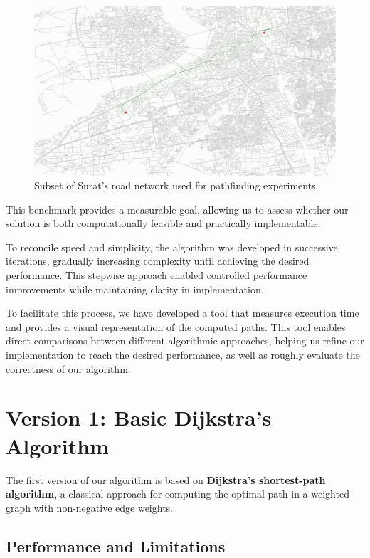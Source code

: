 	\begin{figure}[h]
		\centering
		\includegraphics[width=1.0\textwidth]{surat_graph.png}
		\caption{Subset of Surat's road network used for pathfinding experiments.}
		\label{fig:surat_graph}
	\end{figure}

	This benchmark provides a measurable goal, allowing us to assess whether our solution is both computationally feasible and practically implementable. \newline
	
	To reconcile speed and simplicity, the algorithm was developed in successive iterations, gradually increasing complexity until achieving the desired performance. This stepwise approach enabled controlled performance improvements while maintaining clarity in implementation.\newline
	
	To facilitate this process, we have developed a tool that measures execution time and provides a visual representation of the computed paths. This tool enables direct comparisons between different algorithmic approaches, helping us refine our implementation to reach the desired performance, as well as roughly evaluate the correctness of our algorithm.
	
	\section{Version 1: Basic Dijkstra's Algorithm}
	
	The first version of our algorithm is based on \textbf{Dijkstra's shortest-path algorithm}, a classical approach for computing the optimal path in a weighted graph with non-negative edge weights.
	
	\subsection{Performance and Limitations}
	
